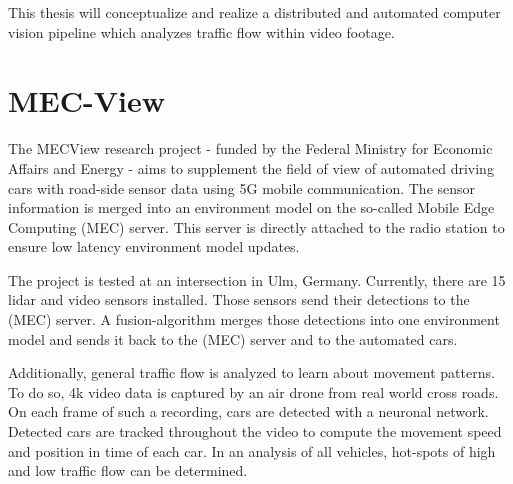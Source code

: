 This thesis will conceptualize and realize a distributed and automated computer vision pipeline which analyzes traffic flow within video footage.



\section{MEC-View}

The MECView research project - funded by the Federal Ministry for Economic Affairs and Energy - aims to supplement the field of view of automated driving cars with road-side sensor data using 5G mobile communication. The sensor information is merged into an environment model on the so-called Mobile Edge Computing (MEC) server. This server is directly attached to the radio station to ensure low latency environment model updates.

The project is tested at an intersection in Ulm, Germany.
Currently, there are 15 lidar and video sensors installed.
Those sensors send their detections to the (MEC) server.
A fusion-algorithm merges those detections into one environment model and sends it back to the (MEC) server and to the automated cars.

Additionally, general traffic flow is analyzed to learn about movement patterns.
To do so, 4k video data is captured by an air drone from real world cross roads.
On each frame of such a recording, cars are detected with a neuronal network.
Detected cars are tracked throughout the video to compute the movement speed and position in time of each car.
In an analysis of all vehicles, hot-spots of high and low traffic flow can be determined.

